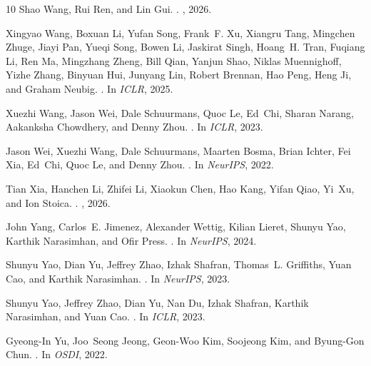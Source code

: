 \begin{thebibliography}{10}
Shao Wang, Rui Ren, and Lin Gui.
.
, 2026.

Xingyao Wang, Boxuan Li, Yufan Song, Frank~F. Xu, Xiangru Tang, Mingchen Zhuge,
  Jiayi Pan, Yueqi Song, Bowen Li, Jaskirat Singh, Hoang~H. Tran, Fuqiang Li,
  Ren Ma, Mingzhang Zheng, Bill Qian, Yanjun Shao, Niklas Muennighoff, Yizhe
  Zhang, Binyuan Hui, Junyang Lin, Robert Brennan, Hao Peng, Heng Ji, and
  Graham Neubig.
.
\newblock In {\em ICLR}, 2025.

Xuezhi Wang, Jason Wei, Dale Schuurmans, Quoc Le, Ed~Chi, Sharan Narang,
  Aakanksha Chowdhery, and Denny Zhou.
.
\newblock In {\em ICLR}, 2023.

Jason Wei, Xuezhi Wang, Dale Schuurmans, Maarten Bosma, Brian Ichter, Fei Xia,
  Ed~Chi, Quoc Le, and Denny Zhou.
.
\newblock In {\em NeurIPS}, 2022.

Tian Xia, Hanchen Li, Zhifei Li, Xiaokun Chen, Hao Kang, Yifan Qiao, Yi~Xu, and
  Ion Stoica.
.
, 2026.

John Yang, Carlos~E. Jimenez, Alexander Wettig, Kilian Lieret, Shunyu Yao,
  Karthik Narasimhan, and Ofir Press.
.
\newblock In {\em NeurIPS}, 2024.

Shunyu Yao, Dian Yu, Jeffrey Zhao, Izhak Shafran, Thomas~L. Griffiths, Yuan
  Cao, and Karthik Narasimhan.
.
\newblock In {\em NeurIPS}, 2023.

Shunyu Yao, Jeffrey Zhao, Dian Yu, Nan Du, Izhak Shafran, Karthik Narasimhan,
  and Yuan Cao.
.
\newblock In {\em ICLR}, 2023.

Gyeong-In Yu, Joo~Seong Jeong, Geon-Woo Kim, Soojeong Kim, and Byung-Gon Chun.
.
\newblock In {\em OSDI}, 2022.


\end{thebibliography}
